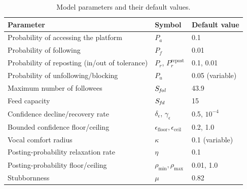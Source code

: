 \documentclass{svproc}
\def\Blue{\color[rgb]{0,0,1}}
\def\Black{\color[rgb]{0,0,0}}
\def\post{\rho}                 %
\def\BoundedConfidence{\epsilon} %
\def\Stubbornness{\mu}           %
\def\maxfollower{S_{\it fol}}    %
\def\maxfeed{S_{\it fd}}         %
\def\VCR{\kappa}                 %
\begin{document}
\begin{table}[t]\Blue
\centering
\caption{Model parameters and their default values.}\label{tab:param}
\tabcolsep=5pt
\begin{tabular}{lll}
\toprule
Parameter & Symbol & Default value \\
\midrule
Probability of accessing the platform & $P_a$ & 0.1 \\
Probability of following & $P_f$ & 0.01 \\
Probability of reposting (in/out of tolerance) & $P_r$, $P_r^{\text{repost}}$ & 0.1, 0.01 \\
Probability of unfollowing/blocking & $P_u$ & 0.05 (variable) \\
Maximum number of followees & $\maxfollower$ & 43.9 \\
Feed capacity & $\maxfeed$ & 15 \\
Confidence decline/recovery rate & $\delta_{\BoundedConfidence}$, $\gamma_{\BoundedConfidence}$ & 0.5, $10^{-4}$ \\
Bounded confidence floor/ceiling & $\BoundedConfidence_{\mathrm{floor}},\BoundedConfidence_{\mathrm{ceil}}$ & 0.2, 1.0 \\
Vocal comfort radius & $\VCR$ & 0.1 (variable) \\
Posting-probability relaxation rate & $\eta$ & 0.1 \\
Posting-probability floor/ceiling & $\post_{\min},\post_{\max}$ & 0.01, 1.0 \\
Stubbornness & $\Stubbornness$ & 0.82 \\
\bottomrule
\end{tabular}\Black
\end{table}
\end{document}

